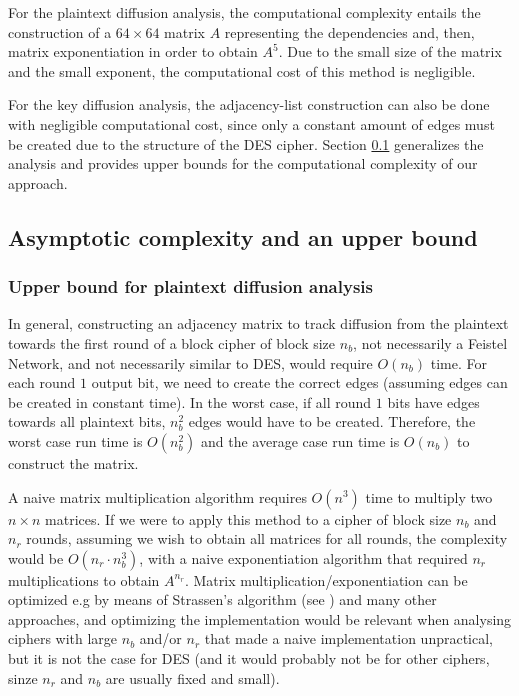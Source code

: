 \documentclass{report}
\begin{document}
For the plaintext diffusion analysis, the computational complexity entails the construction of a $64\times64$ matrix $A$ representing the dependencies and, then, matrix exponentiation in order to obtain $A^5$. Due to the small size of the matrix and the small exponent, the computational cost of this method is negligible.

For the key diffusion analysis, the adjacency-list construction can also be done with negligible computational cost, since only a constant amount of edges must be created due to the structure of the DES cipher. Section \ref{sec:upper-bound} generalizes the analysis and provides upper bounds for the computational complexity of our approach.

\subsection{Asymptotic complexity and an upper bound}\label{sec:upper-bound}

\subsubsection{Upper bound for plaintext diffusion analysis}

In general, constructing an adjacency matrix to track diffusion from the plaintext towards the first round of a block cipher of block size $n_b$, not necessarily a Feistel Network, and not necessarily similar to DES, would require $O(n_b)$ time. For each round $1$ output bit, we need to create the correct edges (assuming edges can be created in constant time). In the worst case, if all round $1$ bits have edges towards all plaintext bits, $n_b^2$ edges would have to be created. Therefore, the worst case run time is $O(n_b^2)$ and the average case run time is $O(n_b)$ to construct the matrix.

A naive matrix multiplication algorithm requires $O(n^3)$ time to multiply two $n \times n$ matrices. If we were to apply this method to a cipher of block size $n_b$ and $n_r$ rounds, assuming we wish to obtain all matrices for all rounds, the complexity would be $O(n_r \cdot n_b^3)$, with a naive exponentiation algorithm that required $n_r$ multiplications to obtain $A^{n_r}$. Matrix multiplication/exponentiation can be optimized e.g by means of Strassen's algorithm (see \cite{Cormen2009}) and many other approaches, and optimizing the implementation would be relevant when analysing ciphers with large $n_b$ and/or $n_r$ that made a naive implementation unpractical, but it is not the case for DES (and it would probably not be for other ciphers, sinze $n_r$ and $n_b$ are usually fixed and small).
\end{document}
